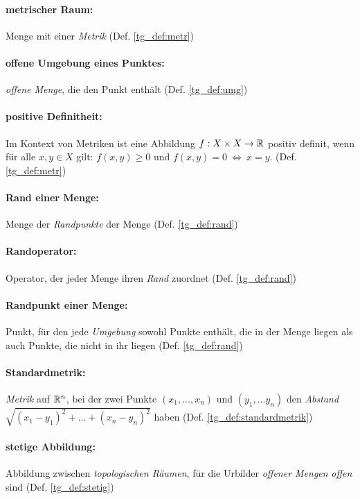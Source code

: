     \paragraph{metrischer Raum:} Menge mit einer \textit{Metrik} (Def. \ref{tg_def:metr})

    \paragraph{offene Umgebung eines Punktes:} \textit{offene Menge}, die den Punkt enthält (Def. \ref{tg_def:umg})
    
    \paragraph{positive Definitheit:} Im Kontext von Metriken ist eine Abbildung $f:X \times X \to \mathbb{R}$ positiv definit, wenn für alle $x,y \in X$ gilt: $f(x,y) \geq 0$ und $f(x,y) = 0 \ \Leftrightarrow \ x = y$. (Def. \ref{tg_def:metr})

    \paragraph{Rand einer Menge:} Menge der \textit{Randpunkte} der Menge (Def. \ref{tg_def:rand})

    \paragraph{Randoperator:} Operator, der jeder Menge ihren \textit{Rand} zuordnet (Def. \ref{tg_def:rand})

    \paragraph{Randpunkt einer Menge:} Punkt, für den jede \textit{Umgebung} sowohl Punkte enthält, die in der Menge liegen als auch Punkte, die nicht in ihr liegen (Def. \ref{tg_def:rand})
    
    \paragraph{Standardmetrik:} \textit{Metrik} auf $\mathbb{R}^n$, bei der zwei Punkte $(x_1, ... , x_n)$ und $(y_1, ... y_n)$ den \textit{Abstand} $\sqrt{(x_1-y_1)^2 + ... + (x_n - y_n)^2}$ haben (Def. \ref{tg_def:standardmetrik})

    \paragraph{stetige Abbildung:} Abbildung zwischen \textit{topologischen Räumen}, für die Urbilder \textit{offener Mengen} \textit{offen} sind (Def. \ref{tg_def:stetig})
    

